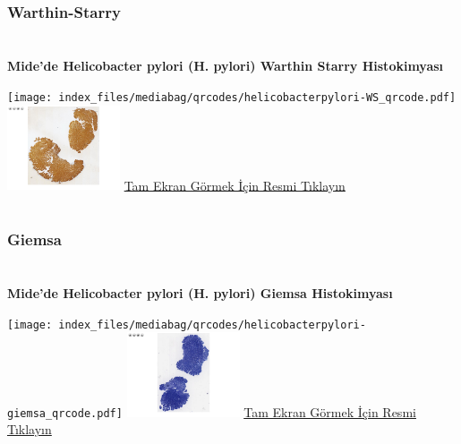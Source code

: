 \documentclass[
  letterpaper,
  DIV=11,
  numbers=noendperiod]{scrreprt}
\begin{document}
\hypertarget{section-1}{%
\chapter{}\label{section-1}}

\hypertarget{warthin-starry}{%
\subsection{Warthin-Starry}\label{warthin-starry}}

\hypertarget{section-2}{%
\chapter{}\label{section-2}}

\textbf{Mide'de Helicobacter pylori (H. pylori) Warthin Starry
Histokimyası}

\texttt{[image: index\_files/mediabag/qrcodes/helicobacterpylori-WS\_qrcode.pdf]}
\href{https://images.patolojiatlasi.com/helicobacterpylori/warthinstarry.html}{\includegraphics[width=0.25\textwidth,height=\textheight]{./screenshots/thumbnail_helicobacterpyloriWS.png}}
\href{https://images.patolojiatlasi.com/helicobacterpylori/warthinstarry.html}{Tam
Ekran Görmek İçin Resmi Tıklayın}

\hypertarget{section-3}{%
\chapter{}\label{section-3}}

\hypertarget{giemsa}{%
\subsection{Giemsa}\label{giemsa}}

\hypertarget{section-4}{%
\chapter{}\label{section-4}}

\textbf{Mide'de Helicobacter pylori (H. pylori) Giemsa Histokimyası}

\texttt{[image: index\_files/mediabag/qrcodes/helicobacterpylori-giemsa\_qrcode.pdf]}
\href{https://images.patolojiatlasi.com/helicobacterpylori/giemsa.html}{\includegraphics[width=0.25\textwidth,height=\textheight]{./screenshots/thumbnail_helicobacterpyloriGiemsa.png}}
\href{https://images.patolojiatlasi.com/helicobacterpylori/giemsa.html}{Tam
Ekran Görmek İçin Resmi Tıklayın}
\end{document}
